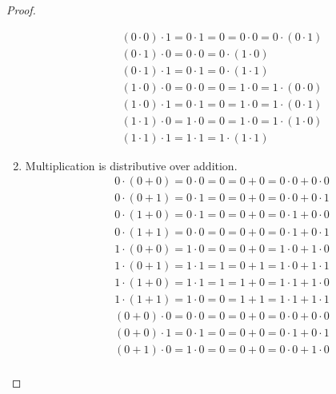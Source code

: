 \begin{proof}
\begin{enumerate}[label = (\arabic*)]
\[\begin{split}
                      &(0 \cdot 0) \cdot 1 = 0 \cdot 1 = 0 = 0 \cdot 0 = 0 \cdot (0 \cdot 1) \\
                      &(0 \cdot 1) \cdot 0 = 0 \cdot 0 = 0 \cdot (1 \cdot 0) \\
                      &(0 \cdot 1) \cdot 1 = 0 \cdot 1 = 0 \cdot (1 \cdot 1) \\
                      &(1 \cdot 0) \cdot 0 = 0 \cdot 0 = 0 = 1 \cdot 0 = 1 \cdot (0 \cdot 0) \\
                      &(1 \cdot 0) \cdot 1 = 0 \cdot 1 = 0 = 1 \cdot 0 = 1 \cdot (0 \cdot 1) \\
                      &(1 \cdot 1) \cdot 0 = 1 \cdot 0 = 0 = 1 \cdot 0 = 1 \cdot (1 \cdot 0) \\
                      &(1 \cdot 1) \cdot 1 = 1 \cdot 1 = 1 \cdot (1 \cdot 1)
                  \end{split}
              \]
        \item Multiplication is distributive over addition.
              \[
                  \begin{split}
                      &0\cdot(0 + 0) = 0\cdot 0 = 0 = 0 + 0 = 0\cdot 0 + 0\cdot 0 \\
                      &0\cdot(0 + 1) = 0\cdot 1 = 0 = 0 + 0 = 0\cdot 0 + 0\cdot 1 \\
                      &0\cdot(1 + 0) = 0\cdot 1 = 0 = 0 + 0 = 0\cdot 1 + 0\cdot 0 \\
                      &0\cdot(1 + 1) = 0\cdot 0 = 0 = 0 + 0 = 0\cdot 1 + 0\cdot 1 \\
                      &1\cdot(0 + 0) = 1\cdot 0 = 0 = 0 + 0 = 1\cdot 0 + 1\cdot 0 \\
                      &1\cdot(0 + 1) = 1\cdot 1 = 1 = 0 + 1 = 1\cdot 0 + 1\cdot 1 \\
                      &1\cdot(1 + 0) = 1\cdot 1 = 1 = 1 + 0 = 1\cdot 1 + 1\cdot 0 \\
                      &1\cdot(1 + 1) = 1\cdot 0 = 0 = 1 + 1 = 1\cdot 1 + 1\cdot 1
                  \end{split}
              \]
              \[
                  \begin{split}
                      &(0 + 0)\cdot 0 = 0\cdot 0 = 0 = 0 + 0 = 0\cdot 0 + 0\cdot 0 \\
                      &(0 + 0)\cdot 1 = 0\cdot 1 = 0 = 0 + 0 = 0\cdot 1 + 0\cdot 1 \\
                      &(0 + 1)\cdot 0 = 1\cdot 0 = 0 = 0 + 0 = 0\cdot 0 + 1\cdot 0 \\

\end{split}\]
\end{enumerate}
\end{proof}
